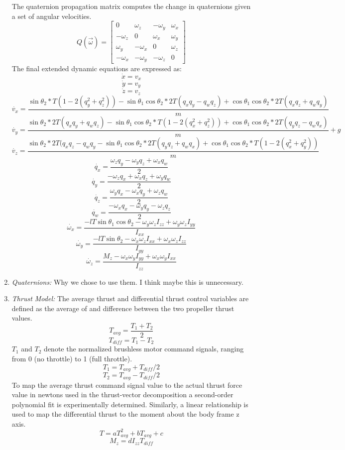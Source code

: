 \documentclass[]{article}
\begin{document}
\begin{enumerate}
\[        \]
The quaternion propagation matrix computes the change in quaternions given a set of angular velocities.
        \[
        Q(\vec{\omega}) =
        \begin{bmatrix}
        0 & \omega_z & -\omega_y & \omega_x \\
        -\omega_z & 0 & \omega_x & \omega_y \\
        \omega_y & -\omega_x & 0 & \omega_z \\
        -\omega_x & -\omega_y & -\omega_z & 0
        \end{bmatrix}
	\]
	The final extended dynamic equations are expressed as:
	\[
		\dot{x} = v_x
	\]
	\[
		\dot{y} = v_y
	\]
	\[
		\dot{z} = v_z
	\]
	\[
		\dot{v_x} = \frac{\sin{\theta_2} *T(1 - 2(q_y^2 + q_z^2))-\sin{\theta_1}\cos{\theta_2}*2T(q_x q_y - q_w q_z)+\cos{\theta_1}\cos{\theta_2}* 2T(q_x q_z + q_w q_y)}{m}
	\]
	\[
		\dot{v_y} =\frac{\sin{\theta_2} *2T(q_x q_y + q_w q_z)-\sin{\theta_1}\cos{\theta_2}*T(1 - 2(q_x^2 + q_z^2))+\cos{\theta_1}\cos{\theta_2}* 2T(q_y q_z - q_w q_x)}{m}+g
	\]
	\[
		\dot{v_z} = \frac{\sin{\theta_2} *2T(q_x q_z - q_w q_y-\sin{\theta_1}\cos{\theta_2}* 2T(q_y q_z + q_w q_x)+\cos{\theta_1}\cos{\theta_2}* T(1 - 2(q_x^2 + q_y^2))}{m}
	\]
	\[
		\dot{q_x} = \frac{\omega_z q_y-\omega_y q_z+ \omega_x q_w}{2}
	\]
	\[
		\dot{q_y} = \frac{-\omega_z q_x+\omega_x q_z+ \omega_y q_w}{2}
	\]
	\[
		\dot{q_z} =  \frac{\omega_y q_x-\omega_x q_y+ \omega_z q_w}{2}
	\]
	\[
		\dot{q_w} =  \frac{-\omega_x q_x - \omega_y q_y - \omega_z q_z}{2}
	\]
	\[
		\dot{\omega_x} = \frac{-lT\sin{\theta_1}\cos{\theta_2}-\omega_y\omega_zI_{zz} + \omega_y\omega_zI_{yy}}{I_{xx}}
	\]
	\[
		\dot{\omega_y} = \frac{-lT\sin{\theta_2}-\omega_x\omega_zI_{xx} + \omega_x\omega_zI_{zz}}{I_{yy}}
	\]
	\[
		\dot{\omega_z} =  \frac{M_z -\omega_x\omega_yI_{yy} + \omega_x\omega_yI_{xx}}{I_{zz}}
	\]
	\item {\em Quaternions:} Why we chose to use them. I think maybe this is unnecessary. 
	\item {\em Thrust Model:}
	The average thrust and differential thrust control variables are defined as the average of and difference between the two propeller thrust values. 
	\[
		T_{avg} =\frac{T_1+T_2}{2}
	\]
	\[
		T_{diff} =T_1-T_2
	\]
$T_1$ and $T_2$ denote the normalized brushless motor command signals, ranging from 0 (no throttle) to 1 (full throttle).
	\[
		T_1 = T_{avg} + T_{diff}/2
	\]
	\[
		T_2 = T_{avg} - T_{diff}/2
	\]
To map the average thrust command signal value to the actual thrust force value in newtons used in the thrust-vector decomposition a second-order polynomial fit is experimentally determined. Similarly, a linear relationship is used to map the differential thrust to the moment about the body frame z axis.
	\[
		T = aT_{avg}^2+bT_{avg}+c
	\]
	\[
		M_z = d I_{zz} T_{diff}
	\]
		\end{enumerate}
	
\end{document}
